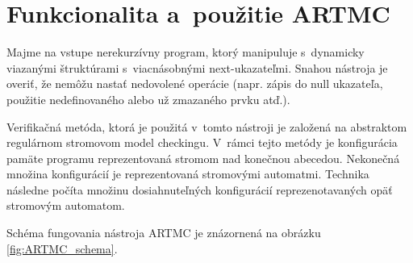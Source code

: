 \section{Funkcionalita a~použitie ARTMC}
Majme na vstupe nerekurzívny program, ktorý manipuluje s~dynamicky viazanými
štruktúrami s~viacnásobnými next-ukazateľmi. Snahou nástroja je overiť, že
nemôžu nastať nedovolené operácie (napr. zápis do null ukazateľa, použitie
nedefinovaného alebo už zmazaného prvku atď.). \cite{artmc1}

Verifikačná metóda, ktorá je použitá v~tomto nástroji je založená na abstraktom
regulárnom stromovom model checkingu. V~rámci tejto metódy je konfigurácia pamäte programu
reprezentovaná stromom nad konečnou abecedou. Nekonečná množina konfigurácií je reprezentovaná
stromovými automatmi. Technika následne počíta množinu dosiahnuteľných konfigurácií
reprezenotavaných opäť stromovým automatom. \cite{artmc2}

Schéma fungovania nástroja ARTMC je znázornená na obrázku \ref{fig:ARTMC_schema}.


